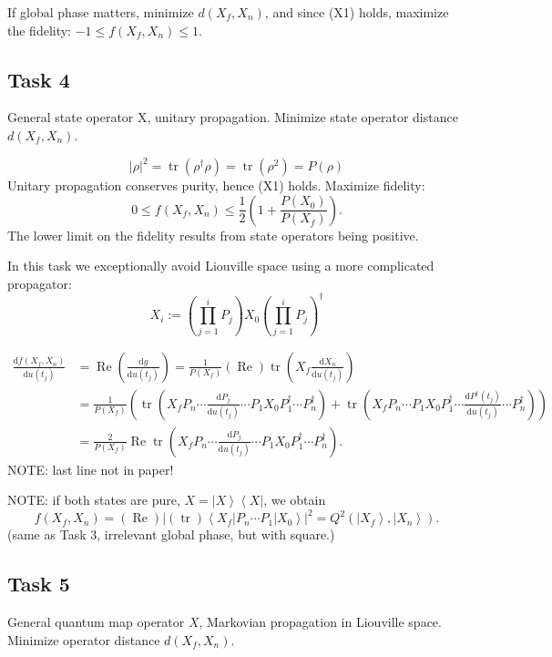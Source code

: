 \documentclass[aps, pra, a4paper]{revtex4}
\newcommand{\be}{\begin{equation}}
\newcommand{\ee}{\end{equation}}
\newcommand{\ket}[1]{\left| #1 \right \rangle}
\newcommand{\bra}[1]{\left \langle #1 \right|}
\newcommand{\ketbra}[2]{\left| #1 \right \rangle \left \langle #2 \right|}
\DeclareMathOperator{\tr}{tr}
\DeclareMathOperator{\re}{Re}
\newcommand{\dd}[2]{\frac{\mathrm{d} #1}{\mathrm{d} #2}}
\begin{document}
If global phase matters, minimize $d(X_f, X_n)$, and since (X1) holds,
maximize the fidelity:
$-1 \le f(X_f, X_n) \le 1$.



\subsection{Task 4}

General state operator X, unitary propagation.
Minimize state operator distance $d(X_f, X_n)$.

\be
|\rho|^2
= \tr(\rho^\dagger \rho)
= \tr(\rho^2)
= P(\rho)
\ee
Unitary propagation conserves purity, hence (X1) holds.
Maximize fidelity:
\be
0 \le f(X_f, X_n) \le \frac{1}{2} \left(1 +\frac{P(X_0)}{P(X_f)}\right).
\ee
The lower limit on the fidelity results from state operators being positive.


In this task we exceptionally avoid Liouville space using a more complicated propagator:
\be
X_i := \left(\prod_{j=1}^{i} P_j\right) X_0 \left(\prod_{j=1}^{i} P_j\right)^\dagger
\ee

\begin{align}
\dd{f(X_f, X_n)}{u(t_j)}
&= \re \left(\dd{g}{u(t_j)} \right)
= \frac{1}{P(X_f)} (\re) \tr \left(X_f \dd{X_n}{u(t_j)}\right)\\
&= \frac{1}{P(X_f)} \left(\tr \left(X_f P_n \cdots \dd{P_j}{u(t_j)} \cdots P_1 X_0 P^\dagger_1 \cdots P^\dagger_n\right)
+\tr\left(X_f P_n \cdots P_1 X_0 P^\dagger_1 \cdots \dd{P^\dagger(t_j)}{u(t_j)} \cdots P^\dagger_n\right)\right)\\
&= \frac{2}{P(X_f)} \re \tr\left(X_f P_n \cdots \dd{P_j}{u(t_j)} \cdots P_1 X_0 P^\dagger_1 \cdots P^\dagger_n\right).
\end{align}
NOTE: last line not in paper!


NOTE: if both states are pure, $X = \ketbra{X}{X}$, we obtain
\be
f(X_f, X_n)
= (\re)\left|(\tr) \bra{X_f}  P_n \cdots P_1 \ket{X_0} \right|^2
= Q^2(\ket{X_f}, \ket{X_n}).
\ee
(same as Task 3, irrelevant global phase, but with square.)


\subsection{Task 5}

General quantum map operator $X$, Markovian propagation
in Liouville space.
Minimize operator distance $d(X_f, X_n)$.
\end{document}
